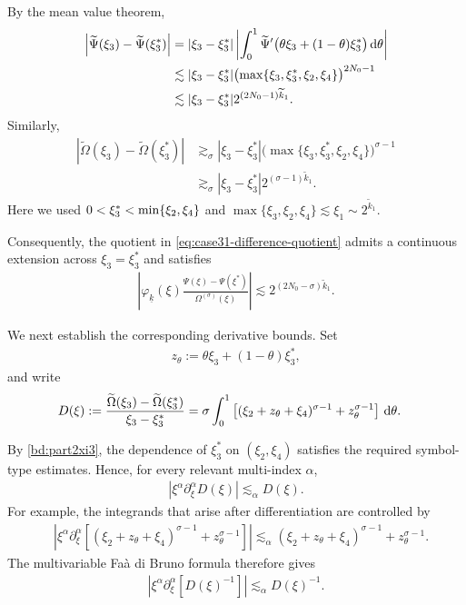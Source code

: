 \documentclass[UTF-8,reqno]{amsart}
\numberwithin{equation}{section}
\theoremstyle{definition}
\def\dif{{\mathord{{\rm d}}}}
\def\min{{\mathord{{\rm min}}}}
\def\dif{{\mathord{{\rm d}}}}
\def\min{{\mathord{{\rm min}}}}
\begin{document}
By the mean value theorem,
\begin{align*}
\left|
\widetilde\Psi(\xi_3)
-\widetilde\Psi(\xi_3^*)
\right|
&=
|\xi_3-\xi_3^*|
\left|
\int_0^1
\widetilde\Psi'
\bigl(
    \theta\xi_3+(1-\theta)\xi_3^*
\bigr)
\,\dif\theta
\right|
\\
&\lesssim
|\xi_3-\xi_3^*|
\bigl(
\max\{\xi_3,\xi_3^*,\xi_2,\xi_4\}
\bigr)^{2N_0-1}
\\
&\lesssim
|\xi_3-\xi_3^*|
2^{(2N_0-1)\widetilde{k}_1}.
\end{align*}
Similarly, 
\begin{align*}
\left|
\widetilde\Omega(\xi_3)
-\widetilde\Omega(\xi_3^*)
\right|
&\gtrsim_\sigma
|\xi_3-\xi_3^*|
\bigl(
\max\{\xi_3,\xi_3^*,\xi_2,\xi_4\}
\bigr)^{\sigma-1}
\\
&\gtrsim_\sigma
|\xi_3-\xi_3^*|
2^{(\sigma-1)\widetilde{k}_1}.
\end{align*}
Here we used
$
    0<\xi_3^*<\min\{\xi_2,\xi_4\}$
and
$
    \max\{\xi_3,\xi_2,\xi_4\}
    \lesssim  \xi_1
    \sim 2^{\widetilde k_1}.
$

Consequently, the quotient in
\eqref{eq:case31-difference-quotient} admits a continuous extension
across $\xi_3=\xi_3^*$ and satisfies
\begin{align}
\left|
\varphi_{\underline{k}}(\xi)
\frac{\Psi(\xi)-\Psi(\xi^*)}
     {\Omega^{(\sigma)}(\xi)}
\right|
\lesssim
2^{(2N_0-\sigma)\widetilde{k}_1}.
\label{bd:case3.1}
\end{align}

We next establish the corresponding derivative bounds. Set
\begin{align*}
z_\theta
:=
\theta\xi_3+(1-\theta)\xi_3^*,
\end{align*}
and write
\begin{align*}
D(\xi)
&:=
\frac{
\widetilde\Omega(\xi_3)
-\widetilde\Omega(\xi_3^*)
}{
\xi_3-\xi_3^*
}=
\sigma
\int_0^1
\left[
    (\xi_2+z_\theta+\xi_4)^{\sigma-1}
    +z_\theta^{\sigma-1}
\right]
\,\dif\theta.
\end{align*}
 

By \eqref{bd:part2xi3}, the dependence of $\xi_3^*$ on
$(\xi_2,\xi_4)$ satisfies the required symbol-type estimates. Hence,
for every relevant multi-index $\alpha$,
\begin{align}
\left|
\xi^\alpha\partial_\xi^\alpha
D(\xi)
\right|
\lesssim_\alpha
D(\xi).
\label{eq:D-symbol-case31}
\end{align}
For example, the integrands that arise after differentiation are
controlled by
\begin{align*}
&\left|
\xi^\alpha\partial_\xi^\alpha
\left[
(\xi_2+z_\theta+\xi_4)^{\sigma-1}
+z_\theta^{\sigma-1}
\right]
\right| 
\lesssim_\alpha
(\xi_2+z_\theta+\xi_4)^{\sigma-1}
+z_\theta^{\sigma-1}.
\end{align*}
The multivariable Fa\`a di Bruno formula therefore gives
\begin{align}
\left|
\xi^\alpha\partial_\xi^\alpha
\left[D(\xi)^{-1}\right]
\right|
\lesssim_\alpha
D(\xi)^{-1}.
\label{eq:D-inverse-case31}
\end{align}
\end{document}
